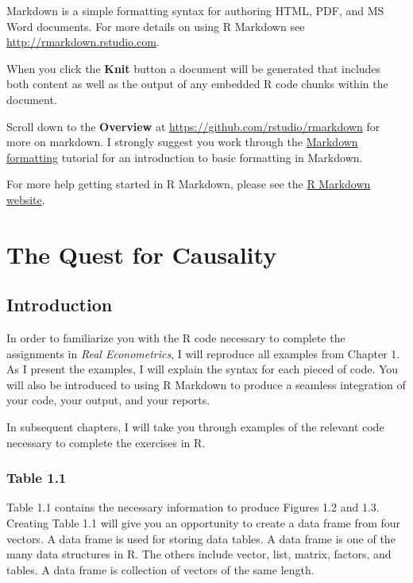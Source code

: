 \documentclass[]{book}
\begin{document}
Markdown is a simple formatting syntax for authoring HTML, PDF, and MS Word documents. For more details on using R Markdown see \url{http://rmarkdown.rstudio.com}.

When you click the \textbf{Knit} button a document will be generated that includes both content as well as the output of any embedded R code chunks within the document.

Scroll down to the \textbf{Overview} at \url{https://github.com/rstudio/rmarkdown} for more on markdown. I strongly suggest you work through the \href{https://www.markdowntutorial.com/}{Markdown formatting} tutorial for an introduction to basic formatting in Markdown.

For more help getting started in R Markdown, please see the \href{https://rmarkdown.rstudio.com/lesson-1.html}{R Markdown website}.

\hypertarget{chp1}{%
\chapter{The Quest for Causality}\label{chp1}}

\hypertarget{introduction}{%
\section{Introduction}\label{introduction}}

In order to familiarize you with the R code necessary to complete the assignments in \emph{Real Econometrics}, I will reproduce all examples from Chapter 1. As I present the examples, I will explain the syntax for each pieced of code. You will also be introduced to using R Markdown to produce a seamless integration of your code, your output, and your reports.

In subsequent chapters, I will take you through examples of the relevant code necessary to complete the exercises in R.

\hypertarget{table-1.1}{%
\subsection{Table 1.1}\label{table-1.1}}

Table 1.1 contains the necessary information to produce Figures 1.2 and 1.3. Creating Table 1.1 will give you an opportunity to create a data frame from four vectors. A data frame is used for storing data tables. A data frame is one of the many data structures in R. The others include vector, list, matrix, factors, and tables. A data frame is collection of vectors of the same length.
\end{document}
